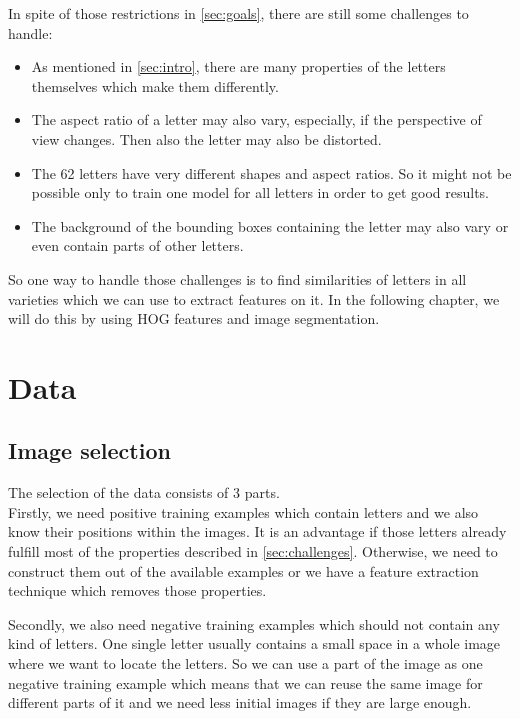 \documentclass[conference]{IEEEtran}
\begin{document}
In spite of those restrictions in \ref{sec:goals}, there are still some challenges to handle:
\begin{itemize}
\item As mentioned in \ref{sec:intro}, there are many properties of the letters themselves which make them differently.
\item The aspect ratio of a letter may also vary, especially, if the perspective of view changes. Then also the letter may also be distorted.
\item The 62 letters have very different shapes and aspect ratios. So it might not be possible only to train one model for all letters in order to get good results.
\item The background of the bounding boxes containing the letter may also vary or even contain parts of other letters.
\end{itemize}
So one way to handle those challenges is to find similarities of letters in all varieties which we can use to extract features on it. In the following chapter, we will do this by using HOG features and image segmentation.

\section{Data}

\subsection{Image selection}

\noindent
The selection of the data consists of 3 parts. \\[-10pt]

Firstly, we need positive training examples which contain letters and we also know their positions within the images. It is an advantage if those letters already fulfill most of the properties described in \ref{sec:challenges}. Otherwise, we need to construct them out of the available examples or we have a feature extraction technique which removes those properties. 

Secondly, we also need negative training examples which should not contain any kind of letters. One single letter usually contains a small space in a whole image where we want to locate the letters. So we can use a part of the image as one negative training example which means that we can reuse the same image for different parts of it and we need less initial images if they are large enough.
\end{document}
